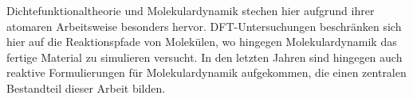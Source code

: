 Dichtefunktionaltheorie und Molekulardynamik stechen hier aufgrund ihrer atomaren Arbeitsweise besonders hervor.
DFT-Untersuchungen beschränken sich hier auf die Reaktionspfade von Molekülen, wo hingegen Molekulardynamik das fertige Material zu simulieren versucht.
In den letzten Jahren sind hingegen auch reaktive Formulierungen für Molekulardynamik aufgekommen, die einen zentralen Bestandteil dieser Arbeit bilden.
